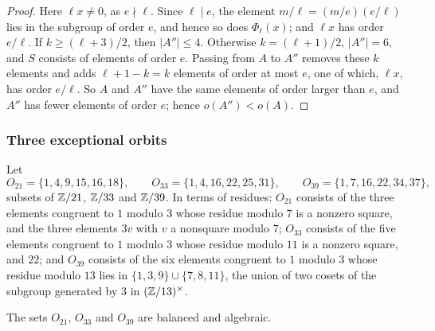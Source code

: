 \begin{proof}
Here $\ell x\ne0$, as $e\nmid\ell$. Since $\ell\mid e$, the element
$m/\ell=(m/e)(e/\ell)$ lies in the subgroup of order $e$, and hence so does
$\Phi_{\ell}(x)$; and $\ell x$ has order $e/\ell$. If $k\ge(\ell+3)/2$, then
$|A''|\le4$. Otherwise $k=(\ell+1)/2$, $|A''|=6$, and $S$ consists of
elements of order $e$. Passing from $A$ to $A''$ removes these $k$ elements
and adds $\ell+1-k=k$ elements of order at most $e$, one of which, $\ell x$,
has order $e/\ell$. So $A$ and $A''$ have the same elements of order larger
than $e$, and $A''$ has fewer elements of order $e$; hence
$o(A'')<o(A)$.
\end{proof}

\subsubsection*{Three exceptional orbits}
Let
\[
  O_{21}=\{1,4,9,15,16,18\},\qquad O_{33}=\{1,4,16,22,25,31\},\qquad
  O_{39}=\{1,7,16,22,34,37\},
\]
subsets of $\mathbb{Z}/21$, $\mathbb{Z}/33$ and $\mathbb{Z}/39$. In terms of residues: $O_{21}$
consists of the three elements congruent to $1$ modulo $3$ whose residue
modulo $7$ is a nonzero square, and the three elements $3v$ with $v$ a
nonsquare modulo $7$; $O_{33}$ consists of the five elements congruent to
$1$ modulo $3$ whose residue modulo $11$ is a nonzero square, and $22$; and
$O_{39}$ consists of the six elements congruent to $1$ modulo $3$ whose
residue modulo $13$ lies in $\{1,3,9\}\cup\{7,8,11\}$, the union of two
cosets of the subgroup generated by $3$ in $(\mathbb{Z}/13)^{\times}$.

\begin{lemma}\label{lem:exceptional}
The sets $O_{21}$, $O_{33}$ and $O_{39}$ are balanced and algebraic.
\end{lemma}

